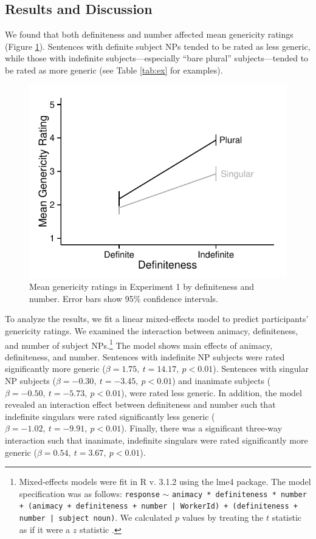 \documentclass[10pt,letterpaper]{article}
\begin{document}
\subsection{Results and Discussion}

We found that both definiteness and number affected mean genericity ratings (Figure \ref{fig:e1}). Sentences with definite subject NPs tended to be rated as less generic, while those with indefinite subjects---especially ``bare plural'' subjects---tended to be rated as more generic (see Table \ref{tab:ex} for examples).

\begin{figure}[t]
\centering
\includegraphics[width=.8\linewidth]{figures/e1.pdf}
\caption{\label{fig:e1} Mean genericity ratings in Experiment 1 by definiteness and number. Error bars show 95\% confidence intervals.}
\end{figure}

To analyze the results, we fit a linear mixed-effects model to predict participants' genericity ratings. We examined the interaction between animacy, definiteness, and number of subject NPs.\footnote{Mixed-effects models were fit in R v. 3.1.2 using the lme4 package. The model specification was as follows: \texttt{response} \(\sim\) \texttt{animacy * definiteness * number + (animacy + definiteness + number | WorkerId) + (definiteness + number | subject noun)}. We calculated \(p\) values by treating the \(t\) statistic as if it were a \(z\) statistic \cite{Barr:2013}.} The model shows main effects of animacy, definiteness, and number. Sentences with indefinite NP subjects were rated significantly more generic (\(\beta = 1.75,~t = 14.17,~p < 0.01\)). Sentences with singular NP subjects (\(\beta = -0.30,~t = -3.45,~p < 0.01\)) and inanimate subjects (\(\beta = -0.50,~t = -5.73,~p < 0.01\)), were rated less generic. In addition, the model revealed an interaction effect between definiteness and number such that indefinite singulars were rated significantly less generic (\(\beta = -1.02,~t = -9.91,~p < 0.01\)). Finally, there was a significant three-way interaction such that inanimate, indefinite singulars were rated significantly more generic (\(\beta = 0.54,~t = 3.67,~p < 0.01\)).
\end{document}
